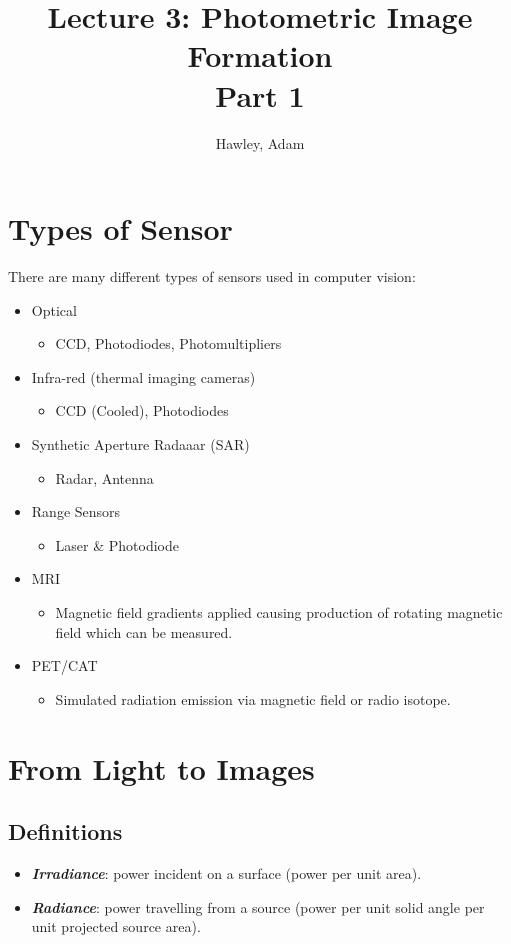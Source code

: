 \documentclass{article}
\author{Hawley, Adam}
\title{Lecture 3: Photometric Image Formation\\Part 1}
\begin{document}
\maketitle
\tableofcontents
\newpage

\section{Types of Sensor}
There are many different types of sensors used in computer vision:
\begin{itemize}
	\item Optical
	\begin{itemize} \item CCD, Photodiodes, Photomultipliers \end{itemize}
	\item Infra-red (thermal imaging cameras)
	\begin{itemize} \item CCD (Cooled), Photodiodes \end{itemize}
	\item Synthetic Aperture Radaaar (SAR)
	\begin{itemize} \item Radar, Antenna \end{itemize}
	\item Range Sensors
	\begin{itemize} \item Laser \& Photodiode \end{itemize}
	\item MRI
	\begin{itemize} \item Magnetic field gradients applied causing production of rotating magnetic field which can be measured. \end{itemize}
	\item PET/CAT
	\begin{itemize} \item Simulated radiation emission via magnetic field or radio isotope. \end{itemize}
\end{itemize}
\section{From Light to Images}
\subsection{Definitions}
\begin{itemize}
	\item {\textit{\textbf {Irradiance}}}: power incident on a surface (power per unit area).
	\item {\textit{\textbf {Radiance}}}: power travelling from a source (power per unit solid angle per unit projected source area).
\end{itemize}
\end{document}
